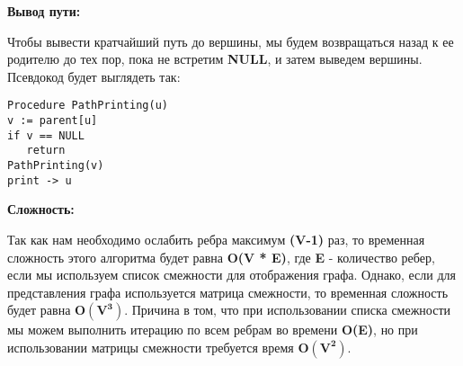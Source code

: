 \textbf{Вывод пути:}

\vspace{\baselineskip}

Чтобы вывести кратчайший путь до вершины, мы будем возвращаться назад к ее родителю до тех пор, пока не встретим \textbf{NULL}, и затем выведем вершины. Псевдокод будет выглядеть так:

\begin{tcolorbox}
\begin{verbatim}
Procedure PathPrinting(u)
v := parent[u]
if v == NULL
   return
PathPrinting(v)
print -> u
\end{verbatim}
\end{tcolorbox}

\textbf{Сложность:}

\vspace{\baselineskip}

Так как нам необходимо ослабить ребра максимум \textbf{(V-1)} раз, то временная сложность этого алгоритма будет равна \textbf{O(V * E)}, где \textbf{E} - количество ребер, если мы используем { список смежности} для отображения графа. Однако, если для представления графа используется { матрица смежности}, то временная сложность будет равна $\mathbf{O(V^3)}$. Причина в том, что при использовании { списка смежности} мы можем выполнить итерацию по всем ребрам во времени \textbf{O(E)}, но при использовании { матрицы смежности} требуется время $\mathbf{O(V^2)}$.